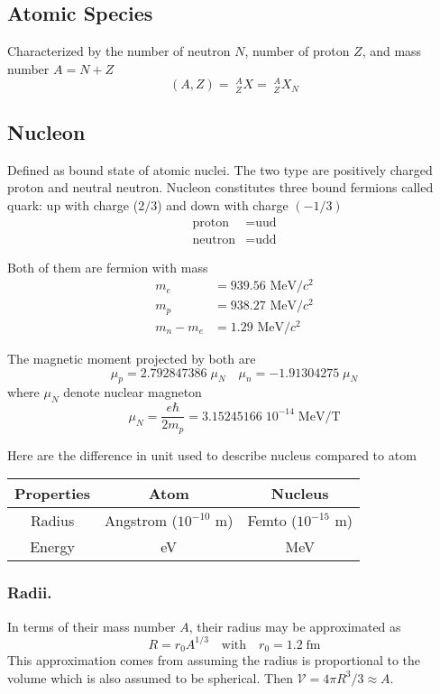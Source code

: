 \documentclass[../../../main.tex]{subfiles}
\begin{document}
\subsection*{Atomic Species}
Characterized by the number of neutron $N$, number of proton $Z$, and mass number $A=N+Z$
\begin{equation*}
    (A,Z)= \;^A_ZX= \;^A_ZX_N
\end{equation*}

\subsection*{Nucleon}
Defined as bound state of atomic nuclei. The two type are positively charged proton and neutral neutron. Nucleon constitutes three bound fermions called quark: up with charge ($2/3$) and down with charge $(-1/3)$
\begin{align*}
    \text{proton}&=\text{uud}\\
    \text{neutron}&=\text{udd}
\end{align*}

Both of them are fermion with mass 
\begin{align*}
    m_e&=939.56 \text{ MeV}/c^2\\ 
    m_p &= 938.27 \text{ MeV}/c^2\\
     m_n-m_e&=1.29 \text{ MeV}/c^2
\end{align*}

The magnetic moment projected by both are 
\begin{equation*}
    \mu_p=2.792 847 386  \;\mu_N\quad \mu_n=-1.913 042 75\;\mu_N
\end{equation*}
where $\mu_N$ denote nuclear magneton
\begin{equation*}
    \mu_N=\frac{e\hbar}{2m_p}=3.152 451 66\; 10^{-14}\;\text{MeV/T}
\end{equation*}

Here are the difference in unit used to describe nucleus compared to atom 
\begin{center}
    \begin{tabular}{c |c| c}
        Properties&Atom&Nucleus\\
        \hline\hline
        Radius&Angstrom ($10^{-10}$ m)&Femto ($10^{-15}$ m)\\
        Energy&eV&MeV
    \end{tabular}
\end{center}

\subsubsection*{Radii.} In terms of their mass number $A$, their radius may be approximated as 
\begin{equation*}
    R=r_0A^{1/3}\quad\text{with}\quad r_0=1.2\;\text{fm}
\end{equation*}
This approximation comes from assuming the radius is proportional to the volume which is also assumed to be spherical. Then $\mathcal{V}=4\pi R^3/3\approx A$. 
\end{document}

